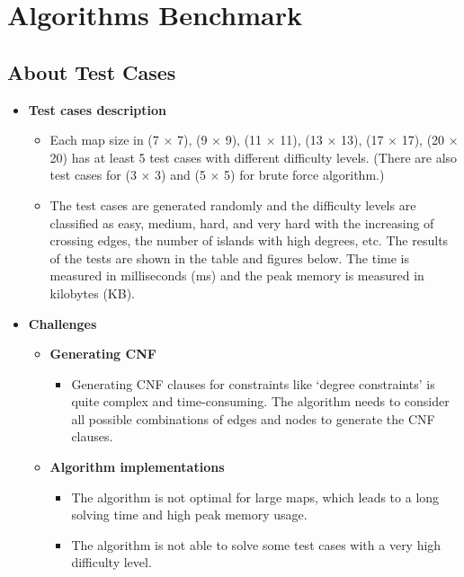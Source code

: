 \section{Algorithms Benchmark}
\subsection{About Test Cases}
\begin{itemize}
    \item \textbf{Test cases description}
          \begin{itemize}
              \item Each map size in (7 × 7), (9 × 9), (11 × 11), (13 × 13), (17 × 17), (20 × 20) has at least 5 test cases with different difficulty levels. (There are also test cases for (3 × 3) and (5 × 5) for brute force algorithm.)
              \item The test cases are generated randomly and the difficulty levels are classified as easy, medium, hard, and very hard with the increasing of crossing edges, the number of islands with high degrees, etc. The results of the tests are shown in the table and figures below. The time is measured in milliseconds (ms) and the peak memory is measured in kilobytes (KB).
          \end{itemize}


    \item \textbf{Challenges}
          \begin{itemize}
              \item \textbf{Generating CNF}
                    \begin{itemize}
                        \item Generating CNF clauses for constraints like `degree constraints' is quite complex and time-consuming. The algorithm needs to consider all possible combinations of edges and nodes to generate the CNF clauses.
                    \end{itemize}
              \item \textbf{Algorithm implementations}
                    \begin{itemize}
                        \item The algorithm is not optimal for large maps, which leads to a long solving time and high peak memory usage.
                        \item The algorithm is not able to solve some test cases with a very high difficulty level.
                    \end{itemize}
          \end{itemize}
\end{itemize}

